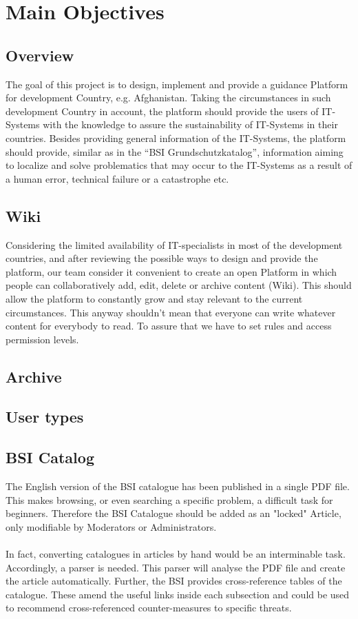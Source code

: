 \chapter{Main Objectives}
\section{Overview}
The goal of this project is to design, implement and provide a guidance Platform for development Country, e.g. Afghanistan. Taking the circumstances in such development Country in account, the platform should provide the users of IT-Systems with the knowledge to assure the sustainability of IT-Systems in their countries. Besides providing general information of the IT-Systems, the platform should provide, similar as in the “BSI Grundschutzkatalog”, information aiming to localize and solve problematics that may occur to the IT-Systems as a result of a human error, technical failure or a catastrophe etc. 

\section{Wiki}
Considering the limited availability of IT-specialists in most of the development countries, and after reviewing the possible ways to design and provide the platform, our team consider it convenient to create an open Platform in which people can collaboratively add, edit, delete or archive content (Wiki). This should allow the platform to constantly grow and stay relevant to the current circumstances. This anyway shouldn’t mean that everyone can write whatever content for everybody to read. To assure that we have to set rules and access permission levels. 

\section{Archive}
\section{User types}
\section{BSI Catalog}
The English version of the BSI catalogue has been published in a single PDF file. This makes browsing, or even searching a specific problem, a difficult task for beginners. Therefore the BSI Catalogue should be added as an "locked" Article, only modifiable by Moderators or Administrators.
\\\\
In fact, converting catalogues in articles by hand would be an interminable task. Accordingly, a parser is needed. This parser will analyse the PDF file and create the article automatically. Further, the BSI provides cross-reference tables of the catalogue. These amend the useful links inside each subsection and could be used to recommend cross-referenced counter-measures to specific threats.\\

